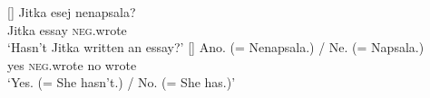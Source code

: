 \documentclass[output=paper,colorlinks,citecolor=brown]{langscibook}
\begin{document}
\begin{exe}
\label{hrdsim:ex:non-v1}
\begin{xlist}
[]{ 
\gll    Jitka esej nenapsala?\\
        Jitka essay \textsc{neg}.wrote\\
        \glt ‘Hasn't Jitka written an essay?'}
[]{
\gll Ano. (= Nenapsala.) / Ne. (= Napsala.)\\
yes {} \textsc{neg}.wrote {} no {} wrote\\
\glt   ‘Yes. (= She hasn't.) / No. (= She has.)' 
}
\end{xlist}
\end{exe}



\end{document}
